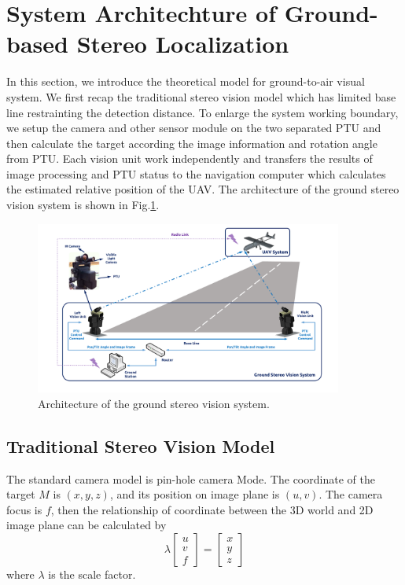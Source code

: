 \section{System Architechture of Ground-based Stereo Localization}
In this section, we introduce the theoretical model for ground-to-air visual system. We first recap the traditional stereo vision model which has limited base line restrainting the detection distance. To enlarge the system working boundary, we setup the camera and other sensor module on the two separated PTU and then calculate the target according the image information and rotation angle from PTU. Each vision unit work independently and transfers the results of image processing and PTU status to the navigation computer which calculates the estimated relative position of the UAV. The architecture of the ground stereo vision system is shown in Fig.\ref{fig:SystemStructure}.


\begin{figure}[!tb]
	\centering
	\includegraphics[width=0.9\textwidth]{Figs/SystemStructure2.pdf}
	\caption{Architecture of the ground stereo vision system.}
	\label{fig:SystemStructure}
\end{figure}




\subsection{Traditional Stereo Vision Model}
The standard camera model is pin-hole camera Mode. The coordinate of the target $M$ is $(x,y,z)$, and its position on image plane is $(u,v)$. The camera focus is $f$, then the relationship of coordinate between the 3D world and 2D image plane can be calculated by 
\begin{equation}
\lambda\left[ {\begin{array}{*{20}{c}}
	u \\ 
	v \\ 
	f 
	\end{array}} \right] =\left[ {\begin{array}{*{20}{c}}
	x \\ 
	y \\ 
	z 
	\end{array}} \right]
\end{equation}
where $\lambda$ is the scale factor. 

